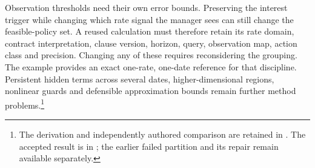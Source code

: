 Observation thresholds need their own error bounds. Preserving the interest trigger while changing which rate signal the manager sees can still change the feasible-policy set. A reused calculation must therefore retain its rate domain, contract interpretation, clause version, horizon, query, observation map, action class and precision. Changing any of these requires reconsidering the grouping. The example provides an exact one-rate, one-date reference for that discipline. Persistent hidden terms across several dates, higher-dimensional regions, nonlinear guards and defensible approximation bounds remain further method problems.\footnote{The derivation and independently authored comparison are retained in . The accepted result is in ; the earlier failed partition and its repair remain available separately.}
